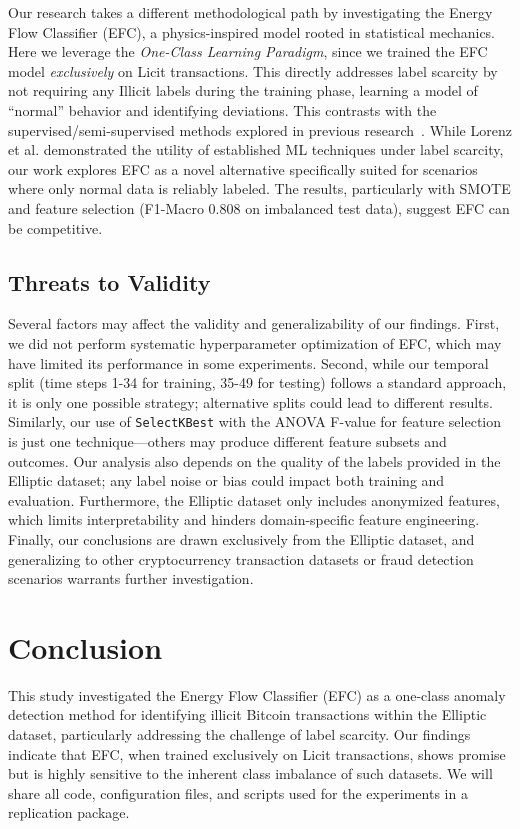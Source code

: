 \documentclass[12pt]{article}
\begin{document}
Our research takes a different methodological path by investigating the Energy Flow Classifier (EFC), a physics-inspired
model rooted in statistical mechanics. Here we leverage the  \emph{One-Class Learning Paradigm}, since we trained the EFC
model \textit{exclusively} on Licit transactions. This directly addresses label scarcity by not requiring any Illicit labels
during the training phase, learning a model of ``normal'' behavior and identifying deviations. This contrasts with the
supervised/semi-supervised methods explored in previous research~\cite{lorenz2021machinelearningmethodsdetect}.
While Lorenz et al. demonstrated the utility of established ML techniques under label scarcity, our work explores EFC as
a novel alternative specifically suited for scenarios where only normal data is reliably labeled. The results, particularly
with SMOTE and feature selection (F1-Macro 0.808 on imbalanced test data), suggest EFC can be competitive. 

\subsection{Threats to Validity}\label{sec:threats}

Several factors may affect the validity and generalizability of our findings. First, we did not perform systematic hyperparameter
optimization of EFC, which may have limited its performance in some experiments. Second, while our temporal split (time
steps 1-34 for training, 35-49 for testing) follows a standard approach, it is only one possible strategy; alternative
splits could lead to different results. Similarly, our use of \texttt{SelectKBest} with the ANOVA F-value for feature
selection is just one technique---others may produce different feature subsets and outcomes.
Our analysis also depends on the quality of the labels provided in the Elliptic dataset; any label noise or bias could
impact both training and evaluation. Furthermore, the Elliptic dataset only includes anonymized features, which limits
interpretability and hinders domain-specific feature engineering. Finally, our conclusions are drawn exclusively from
the Elliptic dataset, and generalizing to other cryptocurrency transaction datasets or fraud detection scenarios warrants
further investigation.

\section{Conclusion} \label{section:conclusion}

This study investigated the Energy Flow Classifier (EFC) as a one-class anomaly detection method for identifying illicit
Bitcoin transactions within the Elliptic dataset, particularly addressing the challenge of label scarcity. Our findings
indicate that EFC, when trained exclusively on Licit transactions, shows promise but is highly sensitive to the inherent
class imbalance of such datasets. We will share all code, configuration files, and scripts used for the experiments in a
replication package. 



\end{document}

